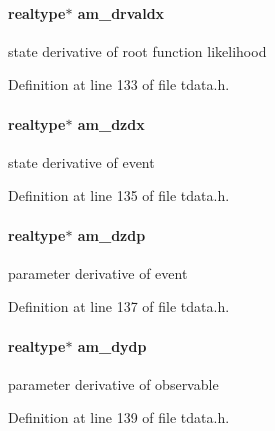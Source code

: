 \hypertarget{struct_temp_data_ae474fa93074514dd5b9d6ef00aa7345d}{}
\paragraph[{am\+\_\+drvaldx}]{\setlength{\rightskip}{0pt plus 5cm}realtype$\ast$ am\+\_\+drvaldx}\label{struct_temp_data_ae474fa93074514dd5b9d6ef00aa7345d}
state derivative of root function likelihood 

Definition at line 133 of file tdata.\+h.

\hypertarget{struct_temp_data_a9309d8a421155cac9ad1c3fd1b5b0f56}{}
\paragraph[{am\+\_\+dzdx}]{\setlength{\rightskip}{0pt plus 5cm}realtype$\ast$ am\+\_\+dzdx}\label{struct_temp_data_a9309d8a421155cac9ad1c3fd1b5b0f56}
state derivative of event 

Definition at line 135 of file tdata.\+h.

\hypertarget{struct_temp_data_a1df093f48bf98db04c63e845d7b1d58b}{}
\paragraph[{am\+\_\+dzdp}]{\setlength{\rightskip}{0pt plus 5cm}realtype$\ast$ am\+\_\+dzdp}\label{struct_temp_data_a1df093f48bf98db04c63e845d7b1d58b}
parameter derivative of event 

Definition at line 137 of file tdata.\+h.

\hypertarget{struct_temp_data_a76083cb4a9598daa381dbaa9c17aadc6}{}
\paragraph[{am\+\_\+dydp}]{\setlength{\rightskip}{0pt plus 5cm}realtype$\ast$ am\+\_\+dydp}\label{struct_temp_data_a76083cb4a9598daa381dbaa9c17aadc6}
parameter derivative of observable 

Definition at line 139 of file tdata.\+h.

